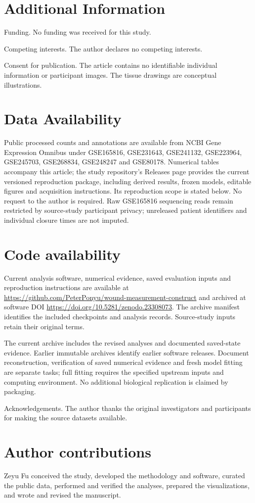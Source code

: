 \documentclass[10pt,a4paper]{article}
\begin{document}
\section*{Additional Information}
Funding. No funding was received for this study.

Competing interests. The author declares no competing interests.





Consent for publication. The article contains no identifiable individual information or participant images. The tissue drawings are conceptual illustrations.

\section*{Data Availability}
Public processed counts and annotations are available from NCBI Gene Expression Omnibus under GSE165816, GSE231643, GSE241132, GSE223964, GSE245703, GSE268834, GSE248247 and GSE80178. Numerical tables accompany this article; the study repository's Releases page provides the current versioned reproduction package, including derived results, frozen models, editable figures and acquisition instructions. Its reproduction scope is stated below. No request to the author is required. Raw GSE165816 sequencing reads remain restricted by source-study participant privacy; unreleased patient identifiers and individual closure times are not imputed.

\section*{Code availability}
Current analysis software, numerical evidence, saved evaluation inputs and reproduction instructions are available at \url{https://github.com/PeterPonyu/wound-measurement-construct} and archived at software DOI \url{https://doi.org/10.5281/zenodo.23308073}. The archive manifest identifies the included checkpoints and analysis records. Source-study inputs retain their original terms.

The current archive includes the revised analyses and documented saved-state evidence. Earlier immutable archives identify earlier software releases. Document reconstruction, verification of saved numerical evidence and fresh model fitting are separate tasks; full fitting requires the specified upstream inputs and computing environment. No additional biological replication is claimed by packaging.

Acknowledgements. The author thanks the original investigators and participants for making the source datasets available.
\FloatBarrier



\section*{Author contributions}
Zeyu Fu conceived the study, developed the methodology and software, curated the public data, performed and verified the analyses, prepared the visualizations, and wrote and revised the manuscript.
\end{document}

